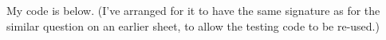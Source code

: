 \begin{answer}
My code is below.  (I've arranged for it to have the same signature as
for the similar question on an earlier sheet, to allow the testing
code to be re-used.)














\end{answer}
